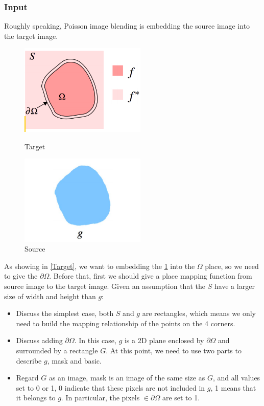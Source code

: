 \documentclass[letterpaper,12pt]{article}
\begin{document}
\subsubsection{Input}
Roughly speaking, Poisson image blending is embedding the source image into the target image.
\begin{figure}[htbp]
	\centering
	\begin{minipage}[t]{0.48\textwidth}
		\centering
		\includegraphics[width=6cm]{Image/1.png}
		\caption{Target}
		\label{Target}
	\end{minipage}
	\begin{minipage}[t]{0.48\textwidth}
		\centering
		\includegraphics[width=6cm]{Image/2.png}
		\caption{Source}
		\label{Source}
	\end{minipage}
\end{figure} 
As showing in \ref{Target}, we want to embedding the \ref{Source} into the $\Omega$
place, so we need to give the $\partial \Omega$. Before that, first we should give a place mapping function from source image to the target image.
\newline
Given an assumption that the $S$ have a larger size of width and height than $g$:
\begin{itemize}
	\item[1] Discuss the simplest case, both $S$ and $g$ are rectangles, which means we only need to build the mapping relationship of the points on the 4 corners.
	\item[2] Discuss adding  $\partial \Omega$. In this case, $g$ is a 2D plane enclosed by $\partial \Omega$ and surrounded by a rectangle $G$. At this point, we need to use two parts to describe $g$, mask and basic. 
	\item[3] Regard $G$ as an image, mask is an image of the same size as $G$, and all values set to 0 or 1, 0 indicate that these pixels are not included in $g$, 1 means that it belongs to $g$. In particular, the pixels $\in \partial \Omega$ are set to 1.
\end{itemize}
\end{document}
